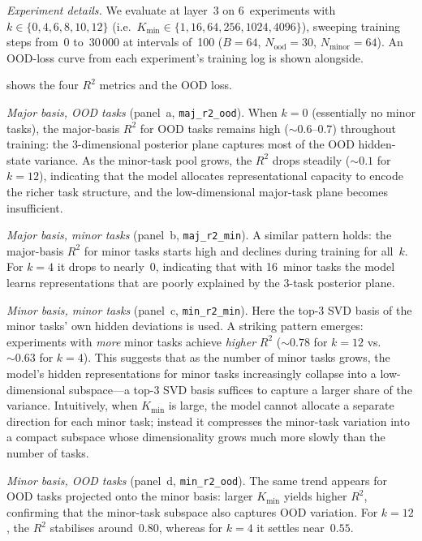 \emph{Experiment details.}
We evaluate at layer~3 on 6~experiments with
$k \in \{0, 4, 6, 8, 10, 12\}$ (i.e.\ $K_{\mathrm{min}} \in \{1, 16, 64,
256, 1024, 4096\}$), sweeping training steps from~0 to~30\,000 at intervals
of~100 ($B = 64$, $N_{\mathrm{ood}} = 30$, $N_{\mathrm{minor}} = 64$).
An OOD-loss curve from each experiment's training log is shown alongside.

 shows the four $R^2$ metrics and the OOD loss.

\emph{Major basis, OOD tasks} (panel~a, \texttt{maj\_r2\_ood}).
When $k = 0$ (essentially no minor tasks), the major-basis $R^2$ for OOD tasks
remains high (${\sim}0.6$--$0.7$) throughout training: the 3-dimensional
posterior plane captures most of the OOD hidden-state variance.
As the minor-task pool grows, the $R^2$ drops steadily (${\sim}0.1$ for
$k = 12$), indicating that the model allocates representational capacity to
encode the richer task structure, and the low-dimensional major-task plane
becomes insufficient.

\emph{Major basis, minor tasks} (panel~b, \texttt{maj\_r2\_min}).
A similar pattern holds: the major-basis $R^2$ for minor tasks starts high and
declines during training for all~$k$.
For $k = 4$ it drops to nearly~0, indicating that with 16~minor tasks the
model learns representations that are poorly explained by the 3-task posterior
plane.

\emph{Minor basis, minor tasks} (panel~c, \texttt{min\_r2\_min}).
Here the top-3 SVD basis of the minor tasks' own hidden deviations is used.
A striking pattern emerges: experiments with \emph{more} minor tasks achieve
\emph{higher} $R^2$ (${\sim}0.78$ for $k = 12$ vs.\ ${\sim}0.63$ for
$k = 4$).
This suggests that as the number of minor tasks grows, the model's hidden
representations for minor tasks increasingly collapse into a low-dimensional
subspace---a top-3 SVD basis suffices to capture a larger share of the
variance.
Intuitively, when $K_{\mathrm{min}}$ is large, the model cannot allocate a
separate direction for each minor task;
instead it compresses the minor-task variation into a compact subspace whose
dimensionality grows much more slowly than the number of tasks.

\emph{Minor basis, OOD tasks} (panel~d, \texttt{min\_r2\_ood}).
The same trend appears for OOD tasks projected onto the minor basis:
larger $K_{\mathrm{min}}$ yields higher $R^2$, confirming that the
minor-task subspace also captures OOD variation.
For $k = 12$, the $R^2$ stabilises around~$0.80$, whereas for $k = 4$ it
settles near~$0.55$.

